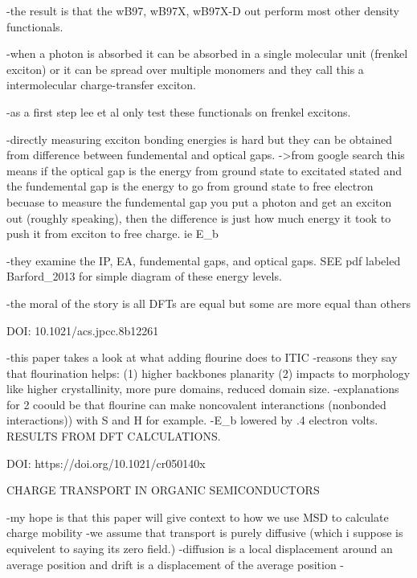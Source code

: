     -the result is that the wB97, wB97X, wB97X-D out perform most other density functionals.

    -when a photon is absorbed it can be absorbed in a single molecular unit (frenkel exciton)
    or it can be spread over multiple monomers and they call this a intermolecular charge-transfer
    exciton. 

    -as a first step lee et al only test these functionals on frenkel excitons. 

    -directly measuring exciton bonding energies is hard but they can be obtained from 
    difference between fundemental and optical gaps. ->from google search this means if the 
    optical gap is the energy from ground state to excitated stated and the fundemental gap
    is the energy to go from ground state to free electron becuase to measure the fundemental 
    gap you put a photon and get an exciton out (roughly speaking), then the difference is just
    how much energy it took to push it from exciton to free charge. ie E_{b}

    -they examine the IP, EA, fundemental gaps, and optical gaps. SEE pdf labeled Barford_2013
    for simple diagram of these energy levels.

    -the moral of the story is all DFTs are equal but some are more equal than others
    

DOI: 10.1021/acs.jpcc.8b12261

    -this paper takes a look at what adding flourine does to ITIC
    -reasons they say that flourination helps: (1) higher backbones planarity
    (2) impacts to morphology like higher crystallinity, more pure domains, reduced domain size.
    -explanations for 2 coould be that flourine can make noncovalent interanctions (nonbonded interactions))
    with S and H for example. 
    -E_{b} lowered by .4 electron volts. RESULTS FROM DFT CALCULATIONS. 


DOI: https://doi.org/10.1021/cr050140x

        CHARGE TRANSPORT IN ORGANIC SEMICONDUCTORS

    -my hope is that this paper will give context to how we use MSD to calculate charge mobility
    -we assume that transport is purely diffusive (which i suppose is equivelent to saying its 
    zero field.) 
    -diffusion is a local displacement around an average position and drift is a displacement of 
    the average position
    -
